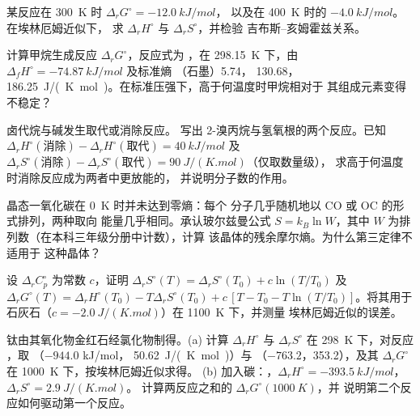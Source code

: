 \begin{exercise}[$\star\star$]\label{exo:b2:reaction-free-energy:7}
某反应在 \qty{300}{K} 时 $\Delta_r G^\circ = \qty{-12.0}{kJ/mol}$，
以及在 \qty{400}{K} 时的 $\qty{-4.0}{kJ/mol}$。在埃林厄姆近似下，
求 $\Delta_r H^\circ$ 与 $\Delta_r S^\circ$，并检验
吉布斯–亥姆霍兹关系。
\end{exercise}

\begin{exercise}[$\star\star$]\label{exo:b2:reaction-free-energy:8}
计算甲烷生成反应 $\Delta_r G^\circ$，反应式为 ，在 \qty{298.15}{K} 下，由 $\Delta_f H^\circ = \qty{-74.87}{kJ/mol}$
及标准熵 （石墨）5.74， 130.68，
\qty{186.25}{J/(K.mol)}。在标准压强下，高于何温度时甲烷相对于
其组成元素变得不稳定？
\end{exercise}

\begin{exercise}[$\star\star$]\label{exo:b2:reaction-free-energy:9}
卤代烷与碱发生取代或消除反应。
写出 2-溴丙烷与氢氧根的两个反应。已知 $\Delta_r
H^\circ(\text{消除}) - \Delta_r H^\circ(\text{取代}) =
\qty{+40}{kJ/mol}$ 及 $\Delta_r S^\circ(\text{消除}) - \Delta_r
S^\circ(\text{取代}) = \qty{+90}{J/(K.mol)}$（仅取数量级），
求高于何温度时消除反应成为两者中更放能的，
并说明分子数的作用。
\end{exercise}

\begin{exercise}[$\star\star\star$]\label{exo:b2:reaction-free-energy:10}
晶态一氧化碳在 \qty{0}{K} 时并未达到零熵：每个
分子几乎随机地以 CO 或 OC 的形式排列，两种取向
能量几乎相同。承认玻尔兹曼公式 $S = k_B\ln W$，其中
$W$ 为排列数（在本科三年级分册中计数），计算
该晶体的残余摩尔熵。为什么第三定律不适用于
这种晶体？
\end{exercise}

\begin{exercise}[$\star\star\star$]\label{exo:b2:reaction-free-energy:11}
设 $\Delta_r C^\circ_p$ 为常数 $c$，证明
$\Delta_r S^\circ(T) = \Delta_r S^\circ(T_0) + c\ln(T/T_0)$ 及
$\Delta_r G^\circ(T) = \Delta_r H^\circ(T_0) - T\Delta_r S^\circ(T_0) +
c\,[T - T_0 - T\ln(T/T_0)]$。将其用于石灰石（$c =
\qty{-2.0}{J/(K.mol)}$）在 \qty{1100}{K} 下，并测量
埃林厄姆近似的误差。
\end{exercise}

\begin{exercise}[$\star\star\star$]\label{exo:b2:reaction-free-energy:12}
钛由其氧化物金红石经氯化物制得。(a) 计算
$\Delta_r H^\circ$ 与 $\Delta_r S^\circ$ 在 \qty{298}{K} 下，对反应 ，取 （$-944.0$ \unit{kJ/mol}，
\qty{50.62}{J/(K.mol)}）与 （$-763.2$，353.2），及其
$\Delta_r G^\circ$ 在 \qty{1000}{K} 下，按埃林厄姆近似求得。
(b) 加入碳：，$\Delta_r H^\circ =
\qty{-393.5}{kJ/mol}$，$\Delta_r S^\circ = \qty{+2.9}{J/(K.mol)}$。
计算两反应之和的 $\Delta_r G^\circ(\qty{1000}{K})$，并
说明第二个反应如何驱动第一个反应。
\end{exercise}

